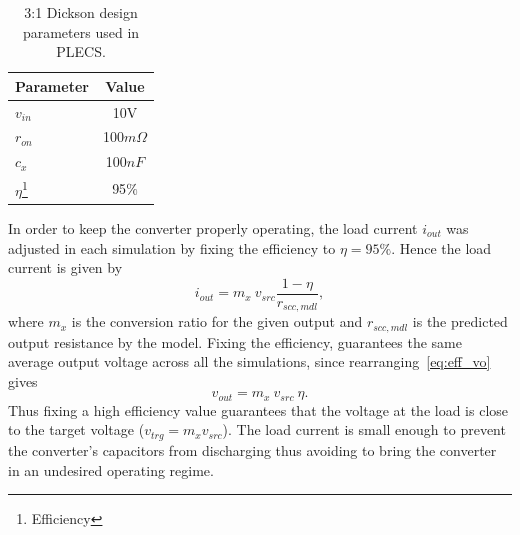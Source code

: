 \begin{table}[h]
\centering
\caption{3:1 Dickson design parameters used in PLECS.}
\label{tab:sim_values}
\renewcommand{\arraystretch}{1.5}%
\begin{tabular}{l | c  }
 Parameter  &  Value  \\
 \midrule
 $v_{in}$   & 10V \\
 $r_{on}$   & 100$m\Omega$ \\
 $c_x$      & 100$nF$\\
 $\eta$\footnote{Efficiency} & 95$\%$
\end{tabular}
\end{table}
In order to keep the converter properly operating, the load current $i_{out}$ was adjusted in each simulation by fixing the efficiency to $\eta=95\%$. Hence the load current is given by
\begin{equation}
    i_{out}=m_x~v_{src}\frac{1-\eta}{r_{scc,mdl}},
\label{eq:iout_eff}
\end{equation}
where $m_x$ is the conversion ratio for the given output and $r_{scc,mdl}$ is the predicted output resistance by the model. Fixing the efficiency, guarantees the same average output voltage across all the simulations, since rearranging~\eqref{eq:eff_vo} gives
\begin{equation}
    v_{out}=m_x~v_{src}~\eta.
\label{eq:vout_eff}
\end{equation}
Thus fixing a high efficiency value guarantees that the voltage at the load is close to the target voltage ($v_{trg}=m_x v_{src}$). The load current is small enough to prevent the converter's capacitors from discharging thus avoiding to bring the converter in an undesired operating regime.

